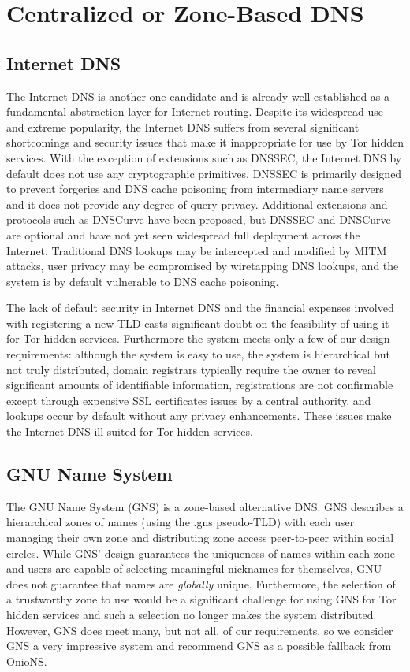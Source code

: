 \section{Centralized or Zone-Based DNS}

\subsection{Internet DNS}

The Internet DNS is another one candidate and is already well established as a fundamental abstraction layer for Internet routing. Despite its widespread use and extreme popularity, the Internet DNS suffers from several significant shortcomings and security issues that make it inappropriate for use by Tor hidden services. With the exception of extensions such as DNSSEC, the Internet DNS by default does not use any cryptographic primitives. DNSSEC is primarily designed to prevent forgeries and DNS cache poisoning from intermediary name servers and it does not provide any degree of query privacy\cite{wachs2014censorship}. Additional extensions and protocols such as DNSCurve\cite{bernstein2009dnscurve} have been proposed, but DNSSEC and DNSCurve are optional and have not yet seen widespread full deployment across the Internet. Traditional DNS lookups may be intercepted and modified by MITM attacks, user privacy may be compromised by wiretapping DNS lookups, and the system is by default vulnerable to DNS cache poisoning.

The lack of default security in Internet DNS and the financial expenses involved with registering a new TLD casts significant doubt on the feasibility of using it for Tor hidden services. Furthermore the system meets only a few of our design requirements: although the system is easy to use, the system is hierarchical but not truly distributed, domain registrars typically require the owner to reveal significant amounts of identifiable information, registrations are not confirmable except through expensive SSL certificates issues by a central authority, and lookups occur by default without any privacy enhancements. These issues make the Internet DNS ill-suited for Tor hidden services.

\subsection{GNU Name System}

The GNU Name System\cite{wachs2014censorship} (GNS) is a zone-based alternative DNS. GNS describes a hierarchical zones of names (using the .gns pseudo-TLD) with each user managing their own zone and distributing zone access peer-to-peer within social circles. While GNS' design guarantees the uniqueness of names within each zone and users are capable of selecting meaningful nicknames for themselves, GNU does not guarantee that names are \emph{globally} unique. Furthermore, the selection of a trustworthy zone to use would be a significant challenge for using GNS for Tor hidden services and such a selection no longer makes the system distributed. However, GNS does meet many, but not all, of our requirements, so we consider GNS a very impressive system and recommend GNS as a possible fallback from OnioNS.

